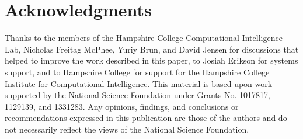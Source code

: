 \documentclass{sig-alternate}
\begin{document}
\section{Acknowledgments}

Thanks to the members of the Hampshire College Computational Intelligence Lab, Nicholas Freitag McPhee, Yuriy Brun, and David Jensen for discussions that helped to improve the work described in this paper, to Josiah Erikson for systems support, and to Hampshire College for support for the Hampshire College Institute for Computational Intelligence. This material is based upon work supported by the National Science Foundation under Grants No. 1017817, 1129139, and 1331283. Any opinions, findings, and conclusions or recommendations expressed in this publication are those of the authors and do not necessarily reflect the views of the National Science Foundation.
\end{document}
